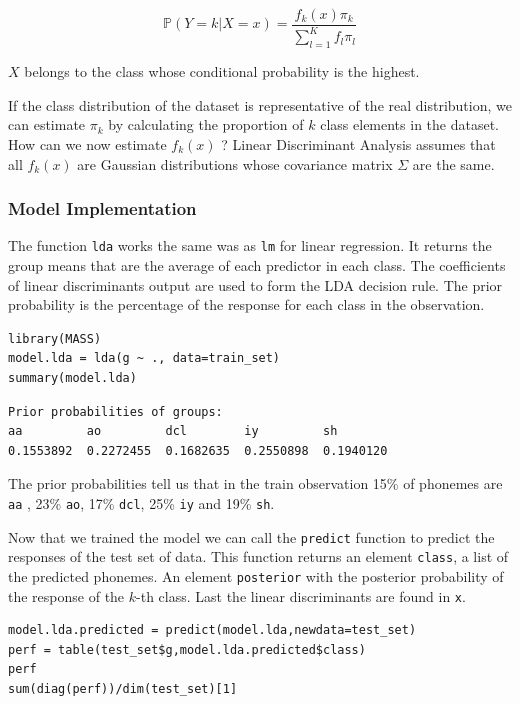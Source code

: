 \documentclass[]{report}
\begin{document}
$$
\mathbb{P}(Y = k | X = x) = \frac{f_k(x)\pi_k}{\sum_{l = 1}^{K}f_l\pi_l} 
$$

$X$ belongs to the class whose conditional probability is the highest.

If the class distribution of the dataset is representative of the real distribution, we can estimate $\pi_k$ by calculating the proportion of $k$ class elements in the dataset. How can we now estimate $f_k(x)$ ? Linear Discriminant Analysis assumes that all $f_k(x)$ are Gaussian distributions whose covariance matrix $\Sigma$ are the same.

\subsubsection{Model Implementation}
The function \texttt{lda} works the same was as \texttt{lm} for linear regression. It returns the group means that are the average of each predictor in each class. The coefficients of linear discriminants output are used to form the LDA decision rule. The prior probability is the percentage of the response for each class in the observation.

\begin{lstlisting}
library(MASS)
model.lda = lda(g ~ ., data=train_set)
summary(model.lda)
\end{lstlisting}

\begin{verbatim}
Prior probabilities of groups:
aa         ao         dcl        iy         sh 
0.1553892  0.2272455  0.1682635  0.2550898  0.1940120 
\end{verbatim}

The prior probabilities tell us that in the train observation 15\% of phonemes are \texttt{aa} , 23\% \texttt{ao}, 17\% \texttt{dcl}, 25\% \texttt{iy} and 19\% \texttt{sh}.

Now that we trained the model we can call the \texttt{predict} function to predict the responses of the test set of data. This function returns an element \texttt{class}, a list of the predicted phonemes. An element \texttt{posterior} with the posterior probability of the response of the $k$-th class.  Last the linear discriminants are found in \texttt{x}.

\begin{lstlisting}
model.lda.predicted = predict(model.lda,newdata=test_set)
perf = table(test_set$g,model.lda.predicted$class)
perf
sum(diag(perf))/dim(test_set)[1]
\end{lstlisting}
\end{document}
